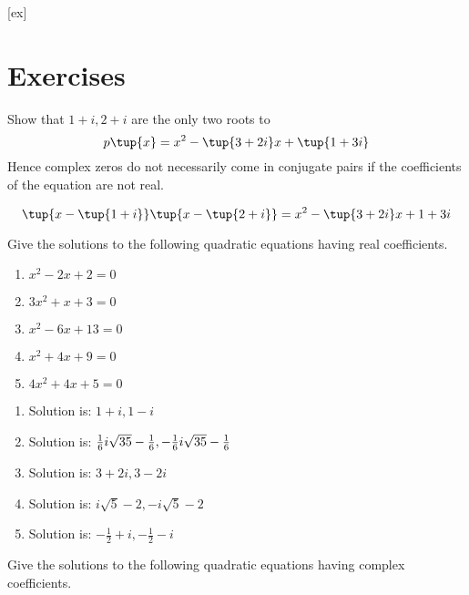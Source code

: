 [ex]
\section*{Exercises}

\begin{enumialphparenastyle}

\begin{ex} Show that $1+i,2+i$ are the only two roots to
\begin{equation*}
p\tup{x} =x^{2}-\tup{3+2i} x+\tup{1+3i}
\end{equation*}
Hence complex zeros do not necessarily come in conjugate pairs if the coefficients of the equation
are not real. 
\begin{sol}
\[
\tup{x-\tup{1+i} } \tup{x-\tup{2+i} }
= x^{2}-\tup{3+2i} x+1+3i
\]
\end{sol}
\end{ex}

\begin{ex} Give the solutions to the following quadratic equations having real
coefficients.

\begin{enumerate}
\item $x^{2}-2x+2=0$

\item $3x^{2}+x+3=0$

\item $x^{2}-6x+13=0$

\item $x^{2}+4x+9=0$

\item $4x^{2}+4x+5=0$
\end{enumerate}
\begin{sol}
\begin{enumerate}
\item Solution is: $1+i,1-i$
\item Solution is: $\frac{1}{6}i\sqrt{35}-\frac{1}{6},-\frac{%
1}{6}i\sqrt{35}-\frac{1}{6}$
\item Solution is: $3+2i,3-2i$
\item Solution is: $i\sqrt{5}-2,-i\sqrt{5}-2$
\item Solution is: $-\frac{1}{2}+i,-\frac{1}{2}-i$
\end{enumerate}
\end{sol}
\end{ex}


\begin{ex} Give the solutions to the following quadratic equations having complex
coefficients.


\end{ex}
\end{enumialphparenastyle}
